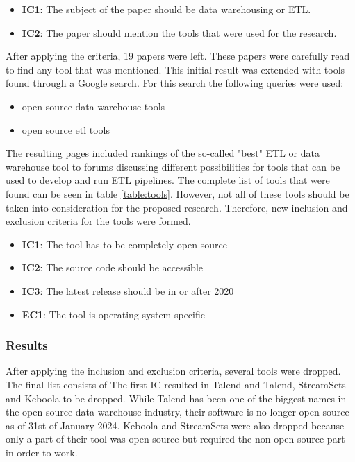 \documentclass[11pt]{article}
\begin{document}
\begin{itemize}
    \item \textbf{IC1}: The subject of the paper should be data warehousing or ETL.
    \item \textbf{IC2}: The paper should mention the tools that were used for the research.
\end{itemize}

After applying the criteria, 19 papers were left. These papers were carefully read to find any tool that was mentioned. This initial result was extended with tools found through a Google search. For this search the following queries were used:

\begin{itemize}
    \item open source data warehouse tools
    \item open source etl tools
\end{itemize}

The resulting pages included rankings of the so-called "best" ETL or data warehouse tool to forums discussing different possibilities for tools that can be used to develop and run ETL pipelines. The complete list of tools that were found can be seen in table \ref{table:tools}. However, not all of these tools should be taken into consideration for the proposed research. Therefore, new inclusion and exclusion criteria for the tools were formed.

\begin{itemize}
    \item \textbf{IC1}: The tool has to be completely open-source
    \item \textbf{IC2}: The source code should be accessible
    \item \textbf{IC3}: The latest release should be in or after 2020
    \item \textbf{EC1}: The tool is operating system specific
\end{itemize}

\subsubsection{Results}
After applying the inclusion and exclusion criteria, several tools were dropped. The final list consists of  The first IC resulted in Talend and Talend, StreamSets and Keboola to be dropped. While Talend has been one of the biggest names in the open-source data warehouse industry, their software is no longer open-source as of 31st of January 2024. Keboola and StreamSets were also dropped because only a part of their tool was open-source but required the non-open-source part in order to work. \\
\end{document}
